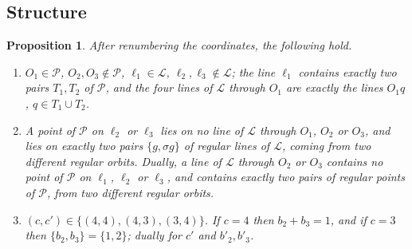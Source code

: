 \documentclass[11pt]{article}
\theoremstyle{plain}
\newtheorem{proposition}[theorem]{Proposition}
\theoremstyle{definition}
\newcommand{\cP}{\mathcal{P}}
\newcommand{\cL}{\mathcal{L}}
\begin{document}
\subsection{Structure}
\begin{proposition}\label{prop:structure}
After renumbering the coordinates, the following hold.
\begin{enumerate}
\item[(a)] $O_1\in\cP$, $O_2,O_3\notin\cP$, $\ell_1\in\cL$, $\ell_2,\ell_3\notin\cL$; the line $\ell_1$ contains exactly two pairs $T_1,T_2$ of $\cP$, and the four lines of $\cL$ through $O_1$ are exactly the lines $O_1q$, $q\in T_1\cup T_2$.
\item[(b)] A point of $\cP$ on $\ell_2$ or $\ell_3$ lies on no line of $\cL$ through $O_1$, $O_2$ or $O_3$, and lies on exactly two pairs $\{g,\sigma g\}$ of regular lines of $\cL$, coming from two different regular orbits.  Dually, a line of $\cL$ through $O_2$ or $O_3$ contains no point of $\cP$ on $\ell_1$, $\ell_2$ or $\ell_3$, and contains exactly two pairs of regular points of $\cP$, from two different regular orbits.
\item[(c)] $(c,c')\in\{(4,4),(4,3),(3,4)\}$.  If $c=4$ then $b_2+b_3=1$, and if $c=3$ then $\{b_2,b_3\}=\{1,2\}$; dually for $c'$ and $b'_2,b'_3$.
\end{enumerate}
\end{proposition}
\end{document}
